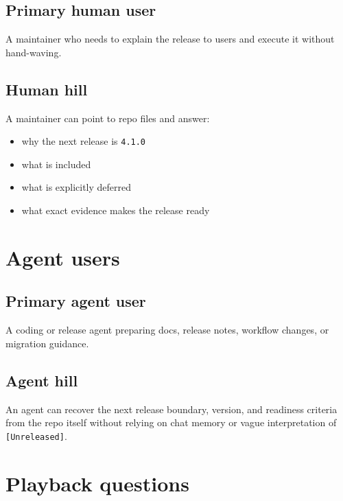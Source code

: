 \subsection{Primary human user}\label{record-202-primary-human-user}

A maintainer who needs to explain the release to users and execute it without hand-waving.

\subsection{Human hill}\label{record-202-human-hill}

A maintainer can point to repo files and answer:

\begin{itemize}
\tightlist
\item
  why the next release is \texttt{4\allowbreak{}.\allowbreak{}1\allowbreak{}.\allowbreak{}0}
\item
  what is included
\item
  what is explicitly deferred
\item
  what exact evidence makes the release ready
\end{itemize}

\section{Agent users}\label{record-202-agent-users}

\subsection{Primary agent user}\label{record-202-primary-agent-user}

A coding or release agent preparing docs, release notes, workflow changes, or migration guidance.

\subsection{Agent hill}\label{record-202-agent-hill}

An agent can recover the next release boundary, version, and readiness criteria from the repo itself without relying on chat memory or vague interpretation of \texttt{[\allowbreak{}U\allowbreak{}n\allowbreak{}r\allowbreak{}e\allowbreak{}l\allowbreak{}e\allowbreak{}a\allowbreak{}s\allowbreak{}e\allowbreak{}d\allowbreak{}]}.

\section{Playback questions}\label{record-202-playback-questions}


